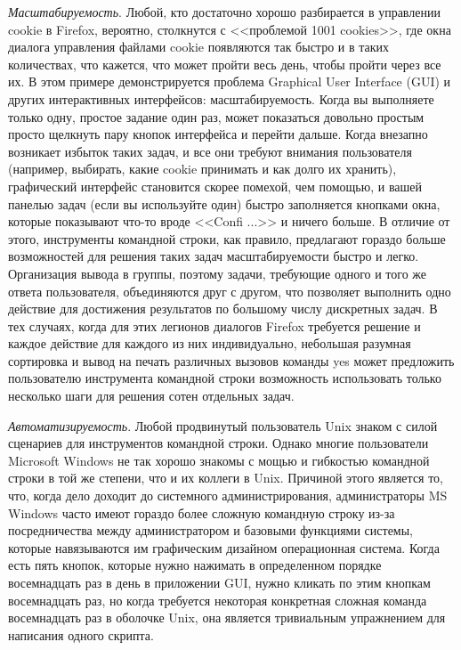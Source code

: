 \textit{Масштабируемость}. Любой, кто достаточно хорошо разбирается в управлении cookie в Firefox, вероятно, столкнутся с <<проблемой 1001 cookies>>, где окна диалога управления файлами cookie появляются так быстро и в таких количествах, что кажется, что может пройти весь день, чтобы пройти через все их. В этом примере демонстрируется проблема Graphical User Interface (GUI) и других интерактивных интерфейсов: масштабируемость. Когда вы выполняете только одну, простое задание один раз, может показаться довольно простым просто щелкнуть пару кнопок интерфейса и перейти дальше. Когда внезапно возникает избыток таких задач, и все они требуют внимания пользователя (например, выбирать, какие cookie принимать и как долго их хранить), графический интерфейс становится скорее помехой, чем помощью, и вашей панелью задач (если вы используйте один) быстро заполняется кнопками окна, которые показывают что-то вроде <<Confi ...>> и ничего больше. В отличие от этого, инструменты командной строки, как правило, предлагают гораздо больше возможностей для решения таких задач масштабируемости быстро и легко. Организация вывода в группы, поэтому задачи, требующие одного и того же ответа пользователя, объединяются друг с другом, что позволяет выполнить одно действие для достижения результатов по большому числу дискретных задач. В тех случаях, когда для этих легионов диалогов Firefox требуется решение и каждое действие для каждого из них индивидуально, небольшая разумная сортировка и вывод на печать различных вызовов команды yes может предложить пользователю инструмента командной строки возможность использовать только несколько шаги для решения сотен отдельных задач.

\textit{Автоматизируемость}. Любой продвинутый пользователь Unix знаком с силой сценариев для инструментов командной строки. Однако многие пользователи Microsoft Windows не так хорошо знакомы с мощью и гибкостью командной строки в той же степени, что и их коллеги в Unix. Причиной этого является то, что, когда дело доходит до системного администрирования, администраторы MS Windows часто имеют гораздо более сложную командную строку из-за посредничества между администратором и базовыми функциями системы, которые навязываются им графическим дизайном операционная система. Когда есть пять кнопок, которые нужно нажимать в определенном порядке восемнадцать раз в день в приложении GUI, нужно кликать по этим кнопкам восемнадцать раз, но когда требуется некоторая конкретная сложная команда восемнадцать раз в оболочке Unix, она является тривиальным упражнением для написания одного скрипта.

